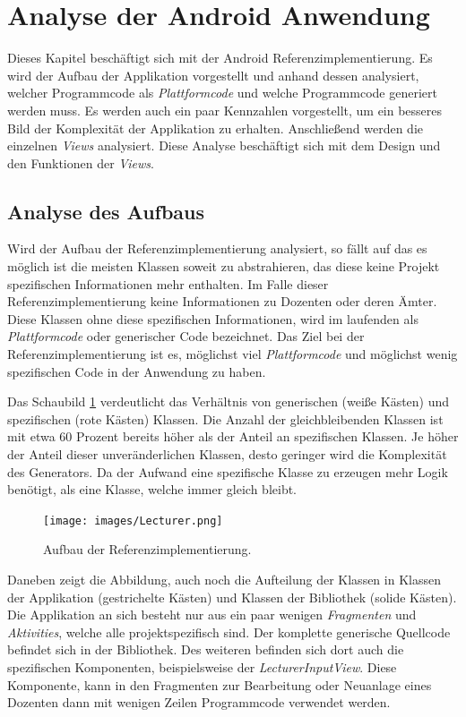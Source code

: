 \section{Analyse der Android Anwendung}
Dieses Kapitel beschäftigt sich mit der Android Referenzimplementierung. Es wird der Aufbau der Applikation vorgestellt und anhand dessen analysiert, welcher Programmcode als \textit{Plattformcode} und welche Programmcode generiert werden muss. Es werden auch ein paar Kennzahlen vorgestellt, um ein besseres Bild der Komplexität der Applikation zu erhalten. Anschließend werden die einzelnen \textit{Views} analysiert. Diese Analyse beschäftigt sich mit dem Design und den Funktionen der \textit{Views}.

\subsection{Analyse des Aufbaus}
Wird der Aufbau der Referenzimplementierung analysiert, so fällt auf das es möglich ist die meisten Klassen soweit zu abstrahieren, das diese keine Projekt spezifischen Informationen mehr enthalten. Im Falle dieser Referenzimplementierung keine Informationen zu Dozenten oder deren Ämter. Diese Klassen ohne diese spezifischen Informationen, wird im laufenden als \textit{Plattformcode} oder generischer Code bezeichnet. Das Ziel bei der Referenzimplementierung ist es, möglichst viel \textit{Plattformcode} und möglichst wenig spezifischen Code in der Anwendung zu haben. 

Das Schaubild \ref{fig:lecturer_structure} verdeutlicht das Verhältnis von generischen (weiße Kästen) und spezifischen (rote Kästen) Klassen. Die Anzahl der gleichbleibenden Klassen ist mit etwa 60 Prozent bereits höher als der Anteil an spezifischen Klassen. Je höher der Anteil dieser unveränderlichen Klassen, desto geringer wird die Komplexität des Generators. Da der Aufwand eine spezifische Klasse zu erzeugen mehr Logik benötigt, als eine Klasse, welche immer gleich bleibt.

\begin{figure}[H]
	\begin{center}
		\texttt{[image: images/Lecturer.png]}
		\caption{Aufbau der Referenzimplementierung.}
		\label{fig:lecturer_structure}
	\end{center}
\end{figure}

Daneben zeigt die Abbildung, auch noch die Aufteilung der Klassen in Klassen der Applikation (gestrichelte Kästen) und Klassen der Bibliothek (solide Kästen). Die Applikation an sich besteht nur aus ein paar wenigen \textit{Fragmenten} und \textit{Aktivities}, welche alle projektspezifisch sind. Der komplette generische Quellcode befindet sich in der Bibliothek. Des weiteren befinden sich dort auch die spezifischen Komponenten, beispielsweise der \textit{LecturerInputView}. Diese Komponente, kann in den Fragmenten zur Bearbeitung oder Neuanlage eines Dozenten dann mit wenigen Zeilen Programmcode verwendet werden.

